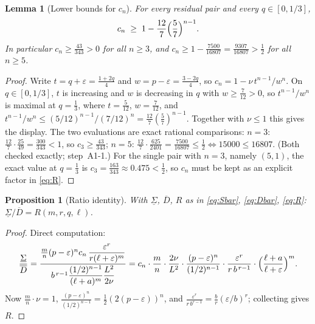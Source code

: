 \documentclass[11pt]{article}
\newtheorem{lemma}[theorem]{Lemma}
\newtheorem{proposition}[theorem]{Proposition}
\theoremstyle{remark}
\theoremstyle{plain}
\theoremstyle{plain}
\begin{document}
\begin{lemma}[Lower bounds for $c_n$]\label{lem:cn}
For every residual pair and every $q\in[0,1/3]$,
\[
        c_n\;\ge\;1-\frac{12}{7}\Bigl(\frac57\Bigr)^{n-1}.
\]
In particular $c_n\ge\frac{43}{343}>0$ for all $n\ge3$, and $c_n\ge1-\frac{7500}{16807}=\frac{9307}{16807}>\frac12$ for all $n\ge5$.
\end{lemma}

\begin{proof}
Write $t=q+\varepsilon=\frac{1+2q}{4}$ and $w=p-\varepsilon=\frac{3-2q}{4}$, so $c_n=1-\nu\,t^{n-1}/w^{n}$.  On $q\in[0,1/3]$, $t$ is increasing and $w$ is decreasing in $q$ with $w\ge\tfrac7{12}>0$, so $t^{n-1}/w^{n}$ is maximal at $q=\tfrac13$, where $t=\tfrac5{12}$, $w=\tfrac7{12}$, and
$t^{n-1}/w^{n}\le(5/12)^{n-1}/(7/12)^{n}=\frac{12}{7}(\frac57)^{n-1}$.
Together with $\nu\le1$ this gives the display.  The two evaluations are exact rational comparisons:
$n=3$: $\frac{12}{7}\cdot\frac{25}{49}=\frac{300}{343}<1$, so $c_3\ge\frac{43}{343}$;
$n=5$: $\frac{12}{7}\cdot\frac{625}{2401}=\frac{7500}{16807}\le\frac12\iff15000\le16807$.
(Both checked exactly; step~A1-1.)  For the single pair with $n=3$, namely $(5,1)$, the exact value at $q=\tfrac13$ is $c_3=\tfrac{163}{343}\approx0.475<\tfrac12$, so $c_n$ must be kept as an explicit factor in \eqref{eq:R}.
\end{proof}

\begin{proposition}[Ratio identity]\label{prop:ratio}
With $\underline\Sigma$, $\overline D$, $R$ as in \eqref{eq:Sbar}, \eqref{eq:Dbar}, \eqref{eq:R}: $\underline\Sigma/\overline D=R(m,r,q,\ell)$.
\end{proposition}

\begin{proof}
Direct computation:
\[
        \frac{\underline\Sigma}{\overline D}
        =\frac{\frac mn(p-\varepsilon)^{n}c_n\,\dfrac{\varepsilon^{r}}{r(\ell+\varepsilon)^{m}}}
              {b^{\,r-1}\dfrac{(1/2)^{n-1}}{(\ell+a)^{m}}\dfrac{L^{2}}{2\nu}}
        =c_n\cdot\frac mn\cdot\frac{2\nu}{L^{2}}\cdot
         \frac{(p-\varepsilon)^{n}}{(1/2)^{n-1}}\cdot
         \frac{\varepsilon^{r}}{r\,b^{\,r-1}}\cdot
         \Bigl(\frac{\ell+a}{\ell+\varepsilon}\Bigr)^{m}.
\]
Now $\frac mn\cdot\nu=1$, $\frac{(p-\varepsilon)^n}{(1/2)^{n-1}}=\tfrac12(2(p-\varepsilon))^n$, and $\frac{\varepsilon^r}{r\,b^{r-1}}=\frac br(\varepsilon/b)^r$; collecting gives $R$.
\end{proof}
\end{document}
